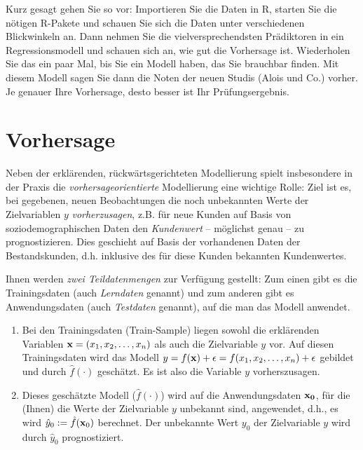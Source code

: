 \documentclass[
]{book}
\begin{document}
Kurz gesagt gehen Sie so vor:
Importieren Sie die Daten in R, starten Sie die nötigen R-Pakete und
schauen Sie sich die Daten unter verschiedenen Blickwinkeln an.
Dann nehmen Sie die vielversprechendsten Prädiktoren in ein Regressionsmodell und schauen sich an,
wie gut die Vorhersage ist.
Wiederholen Sie das ein paar Mal, bis Sie ein Modell haben, das Sie brauchbar finden.
Mit diesem Modell sagen Sie dann die Noten der neuen Studis (Alois und Co.) vorher.
Je genauer Ihre Vorhersage, desto besser ist Ihr Prüfungsergebnis.

\hypertarget{vorhersage}{%
\section{Vorhersage}\label{vorhersage}}

Neben der erklärenden, rückwärtsgerichteten Modellierung spielt insbesondere in der Praxis die \emph{vorhersageorientierte} Modellierung eine wichtige Rolle:
Ziel ist es, bei gegebenen, neuen Beobachtungen die noch unbekannten Werte der Zielvariablen \(y\) \emph{vorherzusagen}, z.B. für neue Kunden auf Basis von soziodemographischen Daten den \emph{Kundenwert} -- möglichst genau -- zu prognostizieren.
Dies geschieht auf Basis der vorhandenen Daten der Bestandskunden,
d.h. inklusive des für diese Kunden bekannten Kundenwertes.

Ihnen werden \emph{zwei Teildatenmengen} zur Verfügung gestellt:
Zum einen gibt es die Trainingsdaten (auch \emph{Lerndaten} genannt) und zum anderen gibt es Anwendungsdaten (auch \emph{Testdaten} genannt), auf die man das Modell anwendet.

\begin{enumerate}
\def\labelenumi{\arabic{enumi}.}
\item
  Bei den Trainingsdaten (Train-Sample) liegen sowohl die erklärenden Variablen \({\bf{x}} = (x_1, x_2, \ldots, x_n)\) als auch die Zielvariable \(y\) vor.
  Auf diesen Trainingsdaten wird das Modell \(y=f({\bf{x}})+\epsilon = f(x_1, x_2, \ldots, x_n)+\epsilon\) gebildet und durch \(\hat{f}(\cdot)\) geschätzt. Es ist also die Variable \(y\) vorherszusagen.
\item
  Dieses geschätzte Modell (\(\hat{f}(\cdot)\)) wird auf die Anwendungsdaten \(\bf{x}_0\), für die (Ihnen) die Werte der Zielvariable \(y\) unbekannt sind, angewendet, d.h., es wird \(\hat{y}_0 :=\hat{f}({\bf{x}}_0)\) berechnet.
  Der unbekannte Wert \(y_0\) der Zielvariable \(y\) wird durch \(\hat{y}_0\) prognostiziert.
\end{enumerate}
\end{document}

